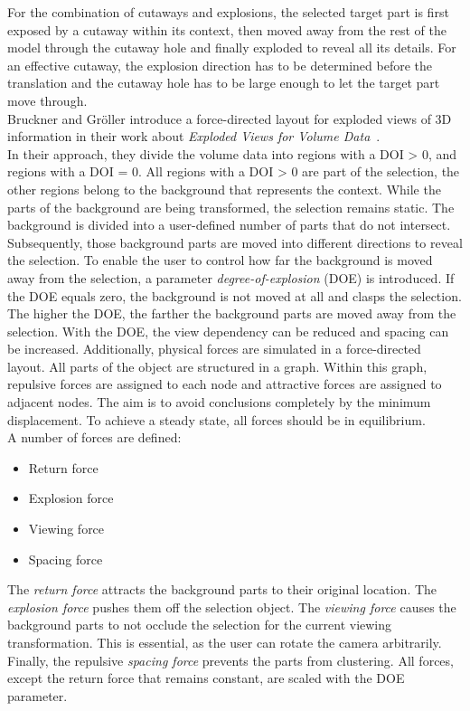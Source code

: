 For the combination of cutaways and explosions, the selected target part is first exposed by a cutaway within its context, then moved away from the rest of the model through the cutaway hole and finally exploded to reveal all its details. For an effective cutaway, the explosion direction has to be determined before the translation and the cutaway hole has to be large enough to let the target part move through.\\
\newline
Bruckner and Gr{\"o}ller introduce a force-directed layout for exploded views of 3D information in their work about \emph{Exploded Views for Volume Data}~\cite{jour:explodedView}.\\
In their approach, they divide the volume data into regions with a DOI > 0, and regions with a DOI = 0. All regions with a DOI > 0 are part of the selection, the other regions belong to the background that represents the context. While the parts of the background are being transformed, the selection remains static. The background is divided into a user-defined number of parts that do not intersect. Subsequently, those background parts are moved into different directions to reveal the selection. To enable the user to control how far the background is moved away from the selection, a parameter \emph{degree-of-explosion} (DOE) is introduced. If the DOE equals zero, the background is not moved at all and clasps the selection. The higher the DOE, the farther the background parts are moved away from the selection. With the DOE, the view dependency can be reduced and spacing can be increased. Additionally, physical forces are simulated in a force-directed layout. All parts of the object are structured in a graph. Within this graph, repulsive forces are assigned to each node and attractive forces are assigned to adjacent nodes. The aim is to avoid conclusions completely by the minimum displacement. To achieve a steady state, all forces should be in equilibrium.\\
A number of forces are defined:
\begin{itemize}
	\item Return force
	\item Explosion force
	\item Viewing force
	\item Spacing force
\end{itemize}
The \emph{return force} attracts the background parts to their original location. The \emph{explosion force} pushes them off the selection object. The \emph{viewing force} causes the background parts to not occlude the selection for the current viewing transformation. This is essential, as the user can rotate the camera arbitrarily. Finally, the repulsive \emph{spacing force} prevents the parts from clustering. All forces, except the return force that remains constant, are scaled with the DOE parameter.\\



